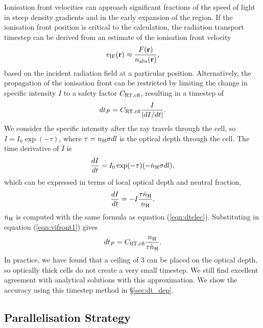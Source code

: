 \documentclass[useAMS,usenatbib]{mn2e}
\begin{document}
Ionisation front velocities can approach significant fractions of the
speed of light in steep density gradients and in the early expansion
of the \hii region.  If the ionisation front position is
critical to the calculation, the radiation transport timestep can be
derived from an estimate of the ionisation front velocity
%
\begin{equation}
  \label{eqn:dt_incident}
  v_{\rm IF}(\mathbf{r}) \approx \frac{F(\mathbf{r})}
  {n_{\rm abs}(\mathbf{r})},
\end{equation}
%
based on the incident radiation field at a particular position.
Alternatively, the propagation of the ionisation front can be
restricted by limiting the change in specific intensity $I$ to a
safety factor $C_{\rm RT,cfl}$, resulting in a timestep of
%
\begin{equation}
  \label{eqn:vifront1}
  dt_P = C_{\rm RT,cfl} \frac{I}{|dI/dt|}.
\end{equation}
%
We consider the specific intensity after the ray travels through the
cell, so $I = I_0 \exp(-\tau)$, where $\tau = n_{\rm H} \sigma dl$ is
the optical depth through the cell.  The time derivative of $I$ is
%
\begin{equation}
  \label{eqn:vifront2}
  \frac{dI}{dt} = I_0 \exp(-\tau) (-\dot{n}_{\rm H} \sigma dl),
\end{equation}
%
which can be expressed in terms of local optical depth and neutral
fraction,
\begin{equation}
  \label{eqn:vifront3}
    \frac{dI}{dt} = -I \frac{\tau \dot{n}_{\rm H}}{n_{\rm H}}.
\end{equation}
%
$\dot{n}_{\rm H}$ is computed with the same formula as equation
(\ref{eqn:dtelec}). Substituting in equation (\ref{eqn:vifront1})
gives
%
\begin{equation}
  \label{eqn:vifront4}
  dt_P = C_{\rm RT,cfl} \frac{n_{\rm H}}{\tau \dot{n}_{\rm H}}.
\end{equation}
%
In practice, we have found that a ceiling of 3 can be placed on the
optical depth, so optically thick cells do not create a very small
timestep.  We still find excellent agreement with analytical solutions
with this approximation.  We show the accuracy using this timestep
method in \S\ref{sec:dt_dep}.

\subsection{Parallelisation Strategy}
\label{sec:parallel}
\end{document}
